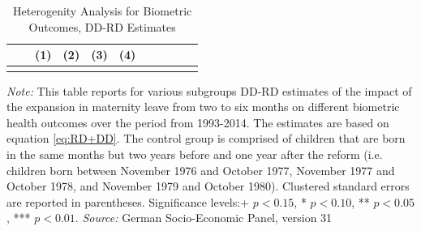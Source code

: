 \documentclass[a4paper ]{article}
\begin{document}
\newpage
\begin{table}[htp] \centering
\def\sym#1{\ifmmode^{#1}\else\(^{#1}\)\fi}
\caption{Heterogenity Analysis for Biometric Outcomes, DD-RD Estimates}\label{tab:Heterog_BM}
\begin{tabular}{l*{10}{c}}
\toprule
&  &\multicolumn{1}{c}{(1)}&\multicolumn{1}{c}{(2)}&\multicolumn{1}{c}{(3)}&\multicolumn{1}{c}{(4)} \\ 
\midrule\\
	 
 \bottomrule
\end{tabular}
\begin{minipage}{\textwidth} %
{\footnotesize \textit{Note:} This table reports for various subgroups DD-RD estimates of the impact of the expansion in maternity leave from two to six months on different biometric health outcomes over the period from 1993-2014. The estimates are based on equation \ref{eq:RD+DD}. The control group is comprised of children that are born in the same months but two years before and one year after the reform (i.e. children born between November 1976 and October 1977, November 1977 and October 1978, and November 1979 and October 1980).\newline
Clustered standard errors are reported in parentheses. Significance levels:+ \(p<0.15\), * \(p<0.10\), ** \(p<0.05\), *** \(p<0.01\). \newline \textit{Source: }German Socio-Economic Panel, version 31\par}
\end{minipage}
\end{table}


	
\end{document}

